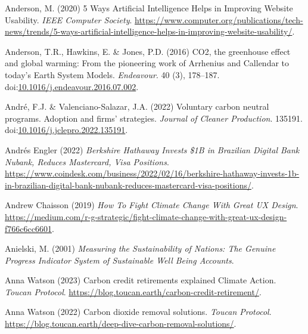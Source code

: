 \documentclass[
  letterpaper,
  DIV=11,
  numbers=noendperiod]{scrartcl}
\newlength{\cslhangindent}
\newenvironment{CSLReferences}[2] %
 {\begin{list}{}{%
  \setlength{\itemindent}{0pt}
  \setlength{\leftmargin}{0pt}
  \setlength{\parsep}{0pt}
  \ifodd #1
   \setlength{\leftmargin}{\cslhangindent}
   \setlength{\itemindent}{-1\cslhangindent}
  \fi
  \setlength{\itemsep}{#2\baselineskip}}}
 {\end{list}}
\begin{document}
\begin{CSLReferences}{0}{1}
Anderson, M. (2020) 5 {Ways Artificial Intelligence Helps} in {Improving
Website Usability}. \emph{IEEE Computer Society}.
\url{https://www.computer.org/publications/tech-news/trends/5-ways-artificial-intelligence-helps-in-improving-website-usability/}.

Anderson, T.R., Hawkins, E. \& Jones, P.D. (2016) {CO2}, the greenhouse
effect and global warming: From the pioneering work of {Arrhenius} and
{Callendar} to today's {Earth System Models}. \emph{Endeavour}. 40 (3),
178--187.
doi:\href{https://doi.org/10.1016/j.endeavour.2016.07.002}{10.1016/j.endeavour.2016.07.002}.

André, F.J. \& Valenciano-Salazar, J.A. (2022) Voluntary carbon neutral
programs. {Adoption} and firms' strategies. \emph{Journal of Cleaner
Production}. 135191.
doi:\href{https://doi.org/10.1016/j.jclepro.2022.135191}{10.1016/j.jclepro.2022.135191}.

Andrés Engler (2022) \emph{Berkshire {Hathaway Invests} \${1B} in
{Brazilian Digital Bank Nubank}, {Reduces Mastercard}, {Visa
Positions}}.
\url{https://www.coindesk.com/business/2022/02/16/berkshire-hathaway-invests-1b-in-brazilian-digital-bank-nubank-reduces-mastercard-visa-positions/}.

Andrew Chaisson (2019) \emph{How {To Fight Climate Change With Great UX
Design}}.
\url{https://medium.com/r-g-strategic/fight-climate-change-with-great-ux-design-f766c6cc6601}.

Anielski, M. (2001) \emph{Measuring the {Sustainability} of {Nations}:
{The Genuine Progress Indicator System} of {Sustainable Well Being
Accounts}}.

Anna Watson (2023) Carbon credit retirements explained {\textbar}
{Climate Action}. \emph{Toucan Protocol}.
\url{https://blog.toucan.earth/carbon-credit-retirement/}.

Anna Watson (2022) Carbon dioxide removal solutions. \emph{Toucan
Protocol}.
\url{https://blog.toucan.earth/deep-dive-carbon-removal-solutions/}.


\end{CSLReferences}
\end{document}
